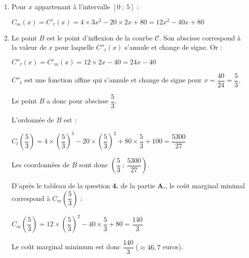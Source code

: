 \begin{corrige}
     \begin{enumerate}
          \item
          Pour $x$ appartenant à l'intervalle $[0~;~5]$ :
          \par
          $C_m(x)=C'_t(x)=4 \times 3x^2-20 \times 2x + 80 = 12 x^2-40x+ 80$
          \item
          Le point $B$ est le point d'inflexion de la courbe $\mathscr{C}$.
          Son abscisse correspond à la valeur de $x$ pour laquelle $C''_t(x)$ s'annule et change de signe.
          Or :
          \par
          $C''_t(x)=C'_m(x)=12 \times 2x-40=24x-40$
          \par
          $C''_t$ est une fonction affine qui s'annule et change de signe pour ${x=\dfrac{40}{24}=\dfrac{5}{3}}$.
          \par
          Le point $B$ a donc pour abscisse $\dfrac{5}{3}$.
          \par
          L'ordonnée de $B$ est :
          \par
          $C_t\left(\dfrac{5}{3}\right)=4 \times \left(\dfrac{5}{3}\right)^3 - 20 \times \left(\dfrac{5}{3}\right)^2 + 80 \times \dfrac{5}{3} +100 = \dfrac{5300}{27}$
          \par
          Les coordonnées de $B$ sont donc $ \left(\dfrac{5}{3}~;~\dfrac{5300}{27}\right)$.
           \par
          D'après le tableau de la question \textbf{4.} de la partie \textbf{A.}, le coût marginal minimal correspond à $C_m\left(\dfrac{5}{3}\right)$ :
          \par
          $C_m\left(\dfrac{5}{3}\right)=12 \times \left(\dfrac{5}{3}\right)^2 - 40 \times \dfrac{5}{3} +80 = \dfrac{140}{3}$
          \par
          Le coût marginal minimum est donc $\dfrac{140}{3}\ $($\approx 46,7$ euros).
          \par
     \end{enumerate}
\end{corrige}
